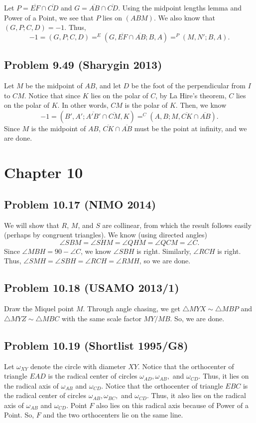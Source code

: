 \documentclass{scrartcl}
\begin{document}
Let $P = \overline{EF} \cap \overline{CD}$ and $G = \overline{AB} \cap \overline{CD}$. Using the midpoint lengths lemma and Power of a Point, we see that $P$
lies on $(ABM)$. We also know that $(G,P;C,D) = -1$. Thus,
\[ -1 = (G, P; C, D) =^E (G, \overline{EF} \cap \overline{AB}; B, A) =^P (M, N'; B, A). \]
\subsection*{Problem 9.49 (Sharygin 2013)}
Let $M$ be the midpoint of $AB$, and let $D$ be the foot of the perpendicular from $I$ to $CM$. Notice that since
$K$ lies on the polar of $C$, by La Hire's theorem, $C$ lies on the polar of $K$. In other words, $CM$ is the polar
of $K$. Then, we know
\[ -1 = (B', A'; \overline{A'B'} \cap \overline{CM}, K) =^C (A,B;M,\overline{CK} \cap \overline{AB}). \]
Since $M$ is the midpoint of $AB$, $\overline{CK} \cap \overline{AB}$ must be the point at infinity, and
we are done.

\section*{Chapter 10}
\subsection*{Problem 10.17 (NIMO 2014)}
We will show that $R$, $M$, and $S$ are collinear, from which the result follows easily (perhaps by congruent
triangles).
We know (using directed angles)
\[ \angle SBM = \angle SHM = \angle QHM = \angle QCM = \angle C. \]
Since $\angle MBH = 90 - \angle C$, we know $\angle SBH$ is right. Similarly, $\angle RCH$ is right.
Thus, $\angle SMH = \angle SBH = \angle RCH = \angle RMH$, so we are done.

\subsection*{Problem 10.18 (USAMO 2013/1)}
Draw the Miquel point $M$. Through angle chasing, we get $\triangle MYX \sim \triangle MBP$ and $\triangle MYZ \sim \triangle MBC$ with
the same scale factor $MY/MB$. So, we are done.

\subsection*{Problem 10.19 (Shortlist 1995/G8)}
Let $\omega_{XY}$ denote the circle with diameter $XY$. Notice that the orthocenter of triangle $EAD$ is the
radical center of circles $\omega_{AD}, \omega_{AB},$ and $\omega_{CD}$. Thus, it lies on the radical axis of
$\omega_{AB}$ and $\omega_{CD}$. Notice that the orthocenter of triangle $EBC$ is the radical center of circles
$\omega_{AB}, \omega_{BC},$ and $\omega_{CD}$. Thus, it also lies on the radical axis of $\omega_{AB}$ and $\omega_{CD}$.
Point $F$ also lies on this radical axis because of Power of a Point. So, $F$ and the two orthocenters lie on
the same line.
\end{document}
